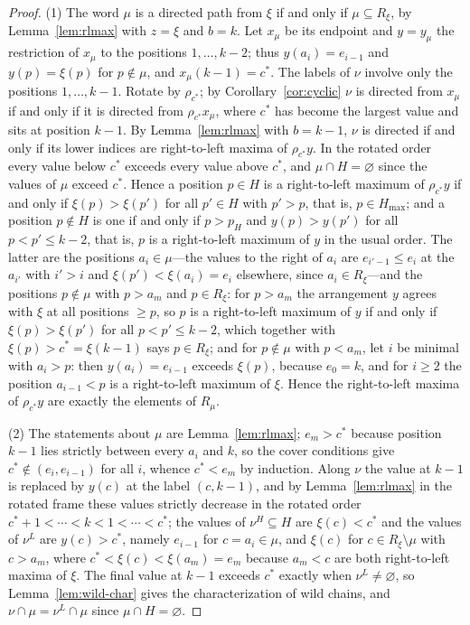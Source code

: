 \documentclass[11pt]{article}
\begin{document}
\begin{proof}
(1) The word $\mu$ is a directed path from $\xi$ if and only if
$\mu\subseteq R_\xi$, by Lemma~\ref{lem:rlmax} with $z=\xi$ and $b=k$.
Let $x_\mu$ be its endpoint and $y=y_\mu$ the restriction of $x_\mu$
to the positions $1,\ldots,k-2$; thus $y(a_i)=e_{i-1}$ and $y(p)=\xi(p)$
for $p\notin\mu$, and $x_\mu(k-1)=c^\ast$. The labels of $\nu$
involve only the positions $1,\ldots,k-1$. Rotate by $\rho_{c^\ast}$;
by Corollary~\ref{cor:cyclic} $\nu$ is directed from $x_\mu$ if and
only if it is directed from $\rho_{c^\ast}x_\mu$, where $c^\ast$ has
become the largest value and sits at position $k-1$. By
Lemma~\ref{lem:rlmax} with $b=k-1$, $\nu$ is directed if and only if
its lower indices are right-to-left maxima of $\rho_{c^\ast}y$. In
the rotated order every value below $c^\ast$ exceeds every value above
$c^\ast$, and $\mu\cap H=\varnothing$ since the values of $\mu$ exceed
$c^\ast$. Hence a position $p\in H$ is a right-to-left maximum of
$\rho_{c^\ast}y$ if and only if $\xi(p)>\xi(p')$ for all $p'\in H$
with $p'>p$, that is, $p\in H_{\max}$; and a position $p\notin H$ is
one if and only if $p>p_H$ and $y(p)>y(p')$ for all $p<p'\leq k-2$,
that is, $p$ is a right-to-left maximum of $y$ in the usual order.
The latter are the positions $a_i\in\mu$---the values to the right of
$a_i$ are $e_{i'-1}\leq e_i$ at the $a_{i'}$ with $i'>i$ and
$\xi(p')<\xi(a_i)=e_i$ elsewhere, since $a_i\in R_\xi$---and the
positions $p\notin\mu$ with $p>a_m$ and $p\in R_\xi$: for $p>a_m$ the
arrangement $y$ agrees with $\xi$ at all positions $\geq p$, so $p$ is
a right-to-left maximum of $y$ if and only if $\xi(p)>\xi(p')$ for
all $p<p'\leq k-2$, which together with $\xi(p)>c^\ast=\xi(k-1)$ says
$p\in R_\xi$; and for $p\notin\mu$ with $p<a_m$, let $i$ be minimal
with $a_i>p$: then $y(a_i)=e_{i-1}$ exceeds $\xi(p)$, because
$e_0=k$, and for $i\geq2$ the position $a_{i-1}<p$ is a right-to-left
maximum of $\xi$. Hence the right-to-left maxima of $\rho_{c^\ast}y$
are exactly the elements of $R_\mu$.

(2) The statements about $\mu$ are Lemma~\ref{lem:rlmax}; $e_m>c^\ast$
because position $k-1$ lies strictly between every $a_i$ and $k$, so
the cover conditions give $c^\ast\notin(e_i,e_{i-1})$ for all $i$,
whence $c^\ast<e_m$ by induction. Along $\nu$ the value at $k-1$ is
replaced by $y(c)$ at the label $(c,k-1)$, and by
Lemma~\ref{lem:rlmax} in the rotated frame these values strictly
decrease in the rotated order $c^\ast+1<\cdots<k<1<\cdots<c^\ast$;
the values of $\nu^H\subseteq H$ are $\xi(c)<c^\ast$ and the values of
$\nu^L$ are $y(c)>c^\ast$, namely $e_{i-1}$ for $c=a_i\in\mu$, and
$\xi(c)$ for $c\in R_\xi\setminus\mu$ with $c>a_m$, where
$c^\ast<\xi(c)<\xi(a_m)=e_m$ because $a_m<c$ are both right-to-left
maxima of $\xi$. The final value at $k-1$ exceeds $c^\ast$ exactly when
$\nu^L\neq\varnothing$, so Lemma~\ref{lem:wild-char} gives the
characterization of wild chains, and $\nu\cap\mu=\nu^L\cap\mu$ since
$\mu\cap H=\varnothing$.


\end{proof}
\end{document}
